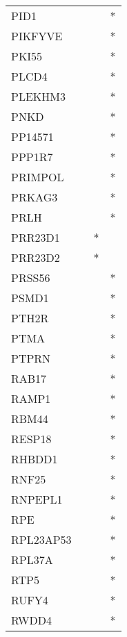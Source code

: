 \begin{longtable}{lccc}
PID1           &           &     &       * \\
PIKFYVE        &           &     &       * \\
PKI55          &           &     &       * \\
PLCD4          &           &     &       * \\
PLEKHM3        &           &     &       * \\
PNKD           &           &     &       * \\
PP14571        &           &     &       * \\
PPP1R7         &           &     &       * \\
PRIMPOL        &           &     &       * \\
PRKAG3         &           &     &       * \\
PRLH           &           &     &       * \\
PRR23D1        &           &   * &         \\
PRR23D2        &           &   * &         \\
PRSS56         &           &     &       * \\
PSMD1          &           &     &       * \\
PTH2R          &           &     &       * \\
PTMA           &           &     &       * \\
PTPRN          &           &     &       * \\
RAB17          &           &     &       * \\
RAMP1          &           &     &       * \\
RBM44          &           &     &       * \\
RESP18         &           &     &       * \\
RHBDD1         &           &     &       * \\
RNF25          &           &     &       * \\
RNPEPL1        &           &     &       * \\
RPE            &           &     &       * \\
RPL23AP53      &           &     &       * \\
RPL37A         &           &     &       * \\
RTP5           &           &     &       * \\
RUFY4          &           &     &       * \\
RWDD4          &           &     &       * \\

\end{longtable}

